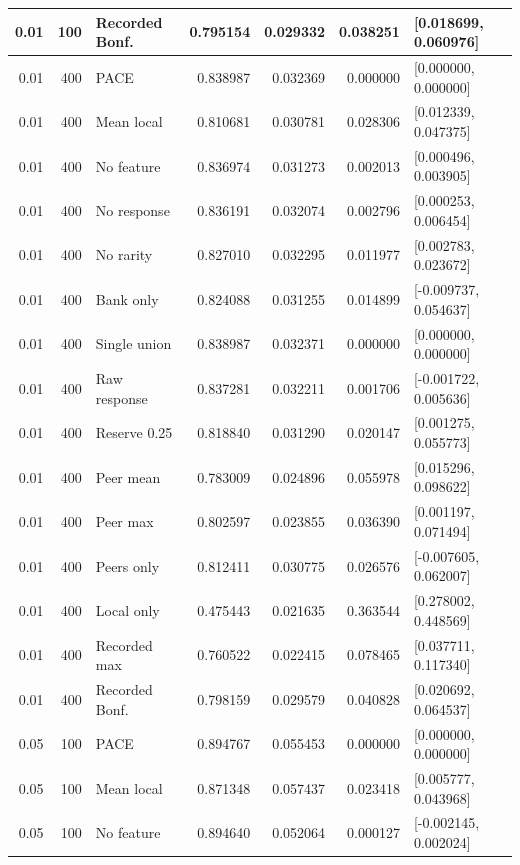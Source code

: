 {\begin{longtable}{rrlrrrrl}
0.01 & 100 & Recorded Bonf. & 0.795154 & 0.029332 & 0.038251 & \multicolumn{2}{l}{[0.018699, 0.060976]}\\
\midrule
0.01 & 400 & PACE & 0.838987 & 0.032369 & 0.000000 & \multicolumn{2}{l}{[0.000000, 0.000000]}\\
0.01 & 400 & Mean local & 0.810681 & 0.030781 & 0.028306 & \multicolumn{2}{l}{[0.012339, 0.047375]}\\
0.01 & 400 & No feature & 0.836974 & 0.031273 & 0.002013 & \multicolumn{2}{l}{[0.000496, 0.003905]}\\
0.01 & 400 & No response & 0.836191 & 0.032074 & 0.002796 & \multicolumn{2}{l}{[0.000253, 0.006454]}\\
0.01 & 400 & No rarity & 0.827010 & 0.032295 & 0.011977 & \multicolumn{2}{l}{[0.002783, 0.023672]}\\
0.01 & 400 & Bank only & 0.824088 & 0.031255 & 0.014899 & \multicolumn{2}{l}{[-0.009737, 0.054637]}\\
0.01 & 400 & Single union & 0.838987 & 0.032371 & 0.000000 & \multicolumn{2}{l}{[0.000000, 0.000000]}\\
0.01 & 400 & Raw response & 0.837281 & 0.032211 & 0.001706 & \multicolumn{2}{l}{[-0.001722, 0.005636]}\\
0.01 & 400 & Reserve 0.25 & 0.818840 & 0.031290 & 0.020147 & \multicolumn{2}{l}{[0.001275, 0.055773]}\\
0.01 & 400 & Peer mean & 0.783009 & 0.024896 & 0.055978 & \multicolumn{2}{l}{[0.015296, 0.098622]}\\
0.01 & 400 & Peer max & 0.802597 & 0.023855 & 0.036390 & \multicolumn{2}{l}{[0.001197, 0.071494]}\\
0.01 & 400 & Peers only & 0.812411 & 0.030775 & 0.026576 & \multicolumn{2}{l}{[-0.007605, 0.062007]}\\
0.01 & 400 & Local only & 0.475443 & 0.021635 & 0.363544 & \multicolumn{2}{l}{[0.278002, 0.448569]}\\
0.01 & 400 & Recorded max & 0.760522 & 0.022415 & 0.078465 & \multicolumn{2}{l}{[0.037711, 0.117340]}\\
0.01 & 400 & Recorded Bonf. & 0.798159 & 0.029579 & 0.040828 & \multicolumn{2}{l}{[0.020692, 0.064537]}\\
\midrule
0.05 & 100 & PACE & 0.894767 & 0.055453 & 0.000000 & \multicolumn{2}{l}{[0.000000, 0.000000]}\\
0.05 & 100 & Mean local & 0.871348 & 0.057437 & 0.023418 & \multicolumn{2}{l}{[0.005777, 0.043968]}\\
0.05 & 100 & No feature & 0.894640 & 0.052064 & 0.000127 & \multicolumn{2}{l}{[-0.002145, 0.002024]}\\

\end{longtable}}
